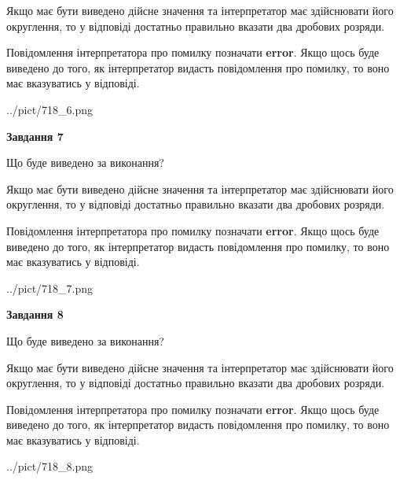 \documentclass[12pt, ukrainian]{article}
\begin{document}
{\begin {Large}
Якщо має бути виведено дійсне значення та інтерпретатор має здійснювати його округлення, 
то у відповіді достатньо правильно вказати два дробових розряди.

Повідомлення інтерпретатора про помилку позначати \textbf{error}.
Якщо щось буде виведено до того, як інтерпретатор видасть повідомлення про помилку, 
то воно має вказуватись у відповіді. \par

\begin{center}
	{../pict/718_6.png}
\end{center}
\newpage

{\begin {center}\textbf{Завдання 7}\end {center}}\par
Що буде виведено за виконання? \par

Якщо має бути виведено дійсне значення та інтерпретатор має здійснювати його округлення, 
то у відповіді достатньо правильно вказати два дробових розряди.

Повідомлення інтерпретатора про помилку позначати \textbf{error}.
Якщо щось буде виведено до того, як інтерпретатор видасть повідомлення про помилку, 
то воно має вказуватись у відповіді. \par

\begin{center}
	{../pict/718_7.png}
\end{center}
\newpage

{\begin {center}\textbf{Завдання 8}\end {center}}\par
Що буде виведено за виконання? \par

Якщо має бути виведено дійсне значення та інтерпретатор має здійснювати його округлення, 
то у відповіді достатньо правильно вказати два дробових розряди.

Повідомлення інтерпретатора про помилку позначати \textbf{error}.
Якщо щось буде виведено до того, як інтерпретатор видасть повідомлення про помилку, 
то воно має вказуватись у відповіді. \par

\begin{center}
	{../pict/718_8.png}
\end{center}
\newpage


\end{Large}}
\end{document}
